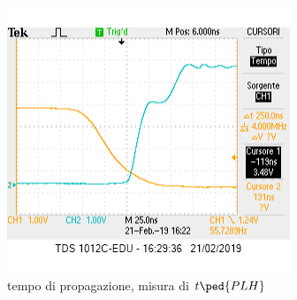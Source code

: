 \documentclass[10pt,a4paper]{article}
\begin{document}
\begin{figure}[h]
			\centering
			\includegraphics[scale=0.85]{schifo2}
			\caption{tempo di propagazione, misura di $t\ped{PLH}$}
			\label{fig:plh}
\end{figure}\clearpage
\end{document}
